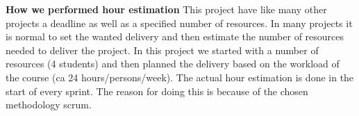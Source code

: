 	{\bf How we performed hour estimation} This project have like many other projects a deadline
	as well as a specified number of resources. In many projects it is normal to set the wanted 
	delivery and then estimate the number of resources needed to deliver the project.
	In this project we started with a number of resources (4 students) and then planned the 
	delivery based on the workload of the course (ca 24 hours/persons/week). The actual 
	hour estimation is done in the start of every sprint. The reason for doing this is because of 
	the chosen methodology scrum.
